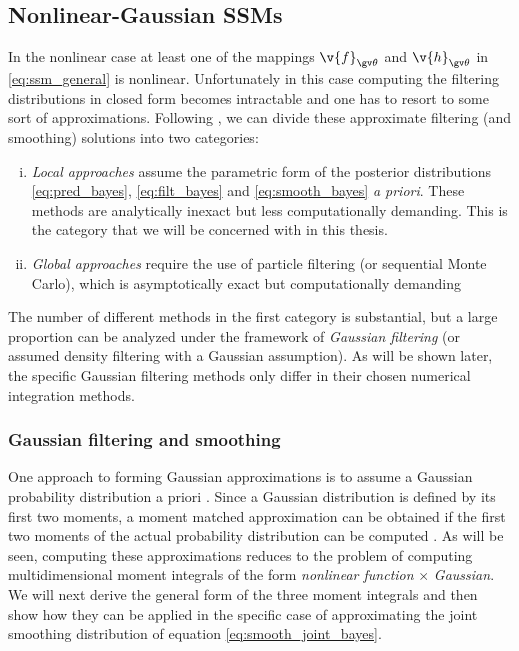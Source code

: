 \subsection{Nonlinear-Gaussian SSMs}%
\label{sec:nonlinear_state}
In the nonlinear case at least one of the mappings $\v{f}_{\Th}$ and $\v{h}_{\Th}$ in
\eqref{eq:ssm_general} is nonlinear. Unfortunately in this case computing the filtering
distributions in closed form becomes intractable and one has to resort to 
some sort of approximations. Following \textcite{Arasaratnam2009}, we can
divide these approximate filtering (and smoothing) solutions into two 
categories: 
\begin{enumerate}[i)] \addtolength{\leftskip}{.5cm} \itemsep1pt \parskip0pt 
  \item \emph{Local approaches} assume the parametric form of the posterior
  distributions \eqref{eq:pred_bayes}, \eqref{eq:filt_bayes} and \eqref{eq:smooth_bayes} \emph{a priori}. 
  These  methods are analytically inexact but less computationally demanding. This is the category that
we will be concerned with in this thesis. 
  \item \emph{Global approaches} require the use of particle filtering (or sequential Monte Carlo), 
  which is asymptotically exact but computationally demanding
\end{enumerate}%
%
The number of different methods in the first category is substantial,
but a large proportion can be analyzed under the framework of
\emph{Gaussian filtering} (or assumed density filtering
with a Gaussian assumption). As will be shown later, the specific Gaussian filtering 
methods only differ in their chosen numerical integration methods.  

\subsubsection{Gaussian filtering and smoothing}

One approach to forming Gaussian approximations is to assume a Gaussian
probability distribution a priori \parencite{Ito2000,Wu2006,Sarkka2010}. 
Since a Gaussian distribution is 
defined by its first two moments, a moment matched approximation
can be obtained if the first two moments of the actual probability
distribution can be computed \parencite{Ito2000,Sarkka2006}. As will
be seen, computing these approximations reduces to the problem
of computing multidimensional moment integrals of the form 
\emph{nonlinear function} $\times$ \emph{Gaussian}. We will next derive 
the general form of the three moment integrals and then show how they can be applied
in the specific case of approximating the joint smoothing distribution
of equation \eqref{eq:smooth_joint_bayes}.

